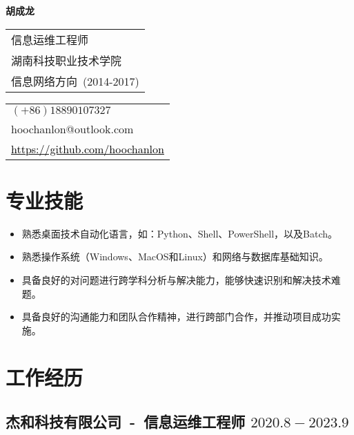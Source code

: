 \documentclass[a4paper,12pt]{article}
\newcommand{\mydash}{
    \noindent\makebox[16cm]{
        \textcolor{gray!70}{
            \hdashrule{16cm}{2.5pt}{2.5pt}
        }
    }
    \vspace{-7ex}
}
\begin{document}
    \begin{CJK*}{UTF8}{gbsn}

    {
        \fontsize{28}{28}
        \textcolor{red!60!brown}{\textbf{胡成龙}}
    }

    {
        \begin{tabular}[t]{@{}l}
            信息运维工程师~ \\
            湖南科技职业技术学院 \\
            信息网络方向~(2014-2017) \\
        \end{tabular}
        \hfill %
        \begin{tabular}[t]{@{}l} %
            $(+86) 18890107327$ \\
            hoochanlon@outlook.com \\
            \href{https://github.com/hoochanlon}
            {\textcolor{black}{https://github.com/hoochanlon}} \\
        \end{tabular}

    }

        \mydash
        \section*{\textcolor{red!50!brown}{专业技能}}
        	\begin{itemize}
        		\item 熟悉桌面技术自动化语言，如：Python、Shell、PowerShell，以及Batch。
        		\item 熟悉操作系统（Windows、MacOS和Linux）和网络与数据库基础知识。
        		\item 具备良好的对问题进行跨学科分析与解决能力，能够快速识别和解决技术难题。
        		\item 具备良好的沟通能力和团队合作精神，进行跨部门合作，并推动项目成功实施。
        	\end{itemize}

        \mydash
        \section*{\textcolor{red!50!brown}{工作经历}}

         	\subsection*{ 杰和科技有限公司~-~信息运维工程师 \hfill $2020.8-2023.9$}

\end{CJK*}
\end{document}
